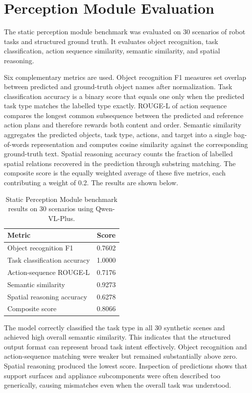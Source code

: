 \documentclass[11pt,oneside]{report}
\begin{document}
\section{Perception Module Evaluation}

The static perception module benchmark was evaluated on 30 scenarios of robot tasks and structured ground truth. It evaluates object recognition, task classification, action sequence similarity, semantic similarity, and spatial reasoning.

Six complementary metrics are used. Object recognition F1 measures set overlap between predicted and ground-truth object names after normalization. Task classification accuracy is a binary score that equals one only when the predicted task type matches the labelled type exactly. ROUGE-L of action sequence compares the longest common subsequence between the predicted and reference action plans and therefore rewards both content and order. Semantic similarity aggregates the predicted objects, task type, actions, and target into a single bag-of-words representation and computes cosine similarity against the corresponding ground-truth text. Spatial reasoning accuracy counts the fraction of labelled spatial relations recovered in the prediction through substring matching. The composite score is the equally weighted average of these five metrics, each contributing a weight of 0.2. The results are shown below.
\begin{table}[htbp]
  \centering
  \label{tab:static-vlo-metrics}
  \begin{tabular}{lc}
    \hline
    Metric & Score \\
    \hline
    Object recognition F1 & 0.7602 \\
    Task classification accuracy & 1.0000 \\
    Action-sequence ROUGE-L & 0.7176 \\
    Semantic similarity & 0.9273 \\
    Spatial reasoning accuracy & 0.6278 \\
    Composite score & 0.8066 \\
    \hline
  \end{tabular}
  \caption{Static Perception Module benchmark results on 30 scenarios using Qwen-VL-Plus.}
\end{table}

The model correctly classified the task type in all 30 synthetic scenes and achieved high overall semantic similarity. This indicates that the structured output format can represent broad task intent effectively. Object recognition and action-sequence matching were weaker but remained substantially above zero. Spatial reasoning produced the lowest score. Inspection of predictions shows that support surfaces and appliance subcomponents were often described too generically, causing mismatches even when the overall task was understood.
\end{document}
